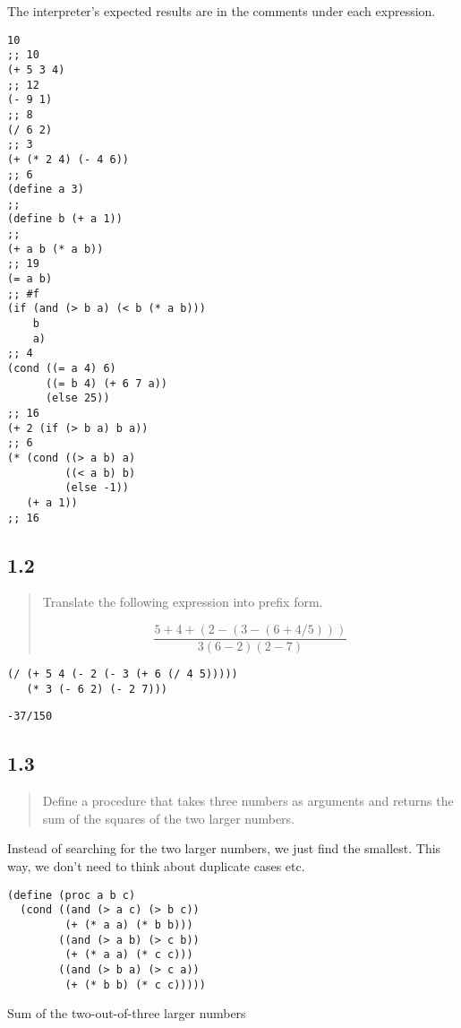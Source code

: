 \documentclass[a4paper, titlepage, twoside]{article}
\begin{document}
The interpreter's expected results are in the comments under each expression.

\begin{verbatim}
10
;; 10
(+ 5 3 4)
;; 12
(- 9 1)
;; 8
(/ 6 2)
;; 3
(+ (* 2 4) (- 4 6))
;; 6
(define a 3)
;;
(define b (+ a 1))
;;
(+ a b (* a b))
;; 19
(= a b)
;; #f
(if (and (> b a) (< b (* a b)))
    b
    a)
;; 4
(cond ((= a 4) 6)
      ((= b 4) (+ 6 7 a))
      (else 25))
;; 16
(+ 2 (if (> b a) b a))
;; 6
(* (cond ((> a b) a)
         ((< a b) b)
         (else -1))
   (+ a 1))
;; 16
\end{verbatim}

\subsection*{1.2}
\label{sec:orga911e64}

\begin{quote}
Translate the following expression into prefix form.

\begin{equation}
\label{eq:1}
\frac{5+4+(2 - (3 - (6 + 4/5)))}{3(6-2)(2-7)}
\end{equation}
\end{quote}

\begin{verbatim}
(/ (+ 5 4 (- 2 (- 3 (+ 6 (/ 4 5)))))
   (* 3 (- 6 2) (- 2 7)))
\end{verbatim}

\begin{verbatim}
-37/150
\end{verbatim}

\subsection*{1.3}
\label{sec:org2df494f}

\begin{quote}
Define a procedure that takes three numbers as arguments and returns the sum of the squares of the two larger numbers.
\end{quote}

Instead of searching for the two larger numbers, we just find the smallest. This way, we don't need to think about duplicate cases etc.

\begin{listing}[htbp]
\begin{verbatim}
(define (proc a b c)
  (cond ((and (> a c) (> b c))
         (+ (* a a) (* b b)))
        ((and (> a b) (> c b))
         (+ (* a a) (* c c)))
        ((and (> b a) (> c a))
         (+ (* b b) (* c c)))))
\end{verbatim}
\caption{\label{lst:orgdccc0fc}Sum of the two-out-of-three larger numbers}
\end{listing}
\end{document}
